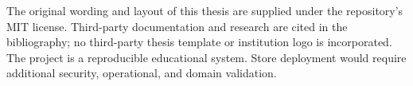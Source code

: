 \documentclass[11pt,a4paper,oneside]{report}
\begin{document}
The original wording and layout of this thesis are supplied under the repository's MIT license. Third-party documentation and research are cited in the bibliography; no third-party thesis template or institution logo is incorporated. The project is a reproducible educational system. Store deployment would require additional security, operational, and domain validation.
\tableofcontents
\listoffigures
\listoftables
\clearpage{}










\appendix

\end{document}

